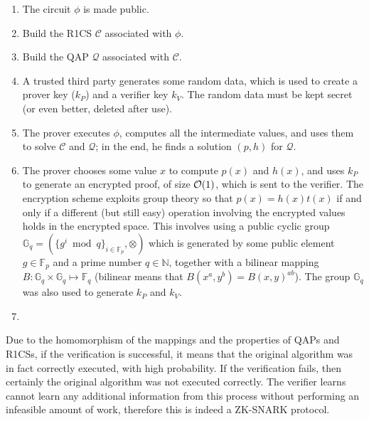 \begin{enumerate}
	\item The circuit \(\phi \) is made public.
	\item Build the R1CS \(\mathcal{C}\) associated with \(\phi \).
	\item Build the QAP \(\mathcal{Q}\) associated with \(\mathcal{C}\).
	\item A trusted third party generates some random data, which is used to create a prover key
	      (\(k_P\)) and a verifier key \(k_V\). The random data must be kept secret
	      (or even better, deleted after use).
	\item The prover executes \(\phi \), computes all the intermediate values, and uses them to
	      solve \(\mathcal{C}\) and \(\mathcal{Q}\); in the end, he finds a solution \((p, h)\)
	      for \(\mathcal{Q}\).
	\item The prover chooses some value \(x\) to compute \(p(x)\) and \(h(x)\), and uses \(k_P\)
	      to generate an encrypted proof, of size \(\mathcal{O}(1)\), which is sent to the verifier.
	      The encryption scheme exploits group theory so that \(p(x) = h(x)t(x)\) if and only if
	      a different (but still easy) operation involving the encrypted values holds in the
	      encrypted space.
	      This involves using a public cyclic group 
        \(\mathbb{G}_q = ({\{g^i \bmod q\}}_{i \in \mathbb{F}_p}, \otimes)\) which is generated by 
        some public element \(g \in \mathbb{F}_p\) and a 
        prime number \(q \in \mathbb{N}\), together with a bilinear mapping
	      \(B\colon \mathbb{G}_q \times \mathbb{G}_q \mapsto \mathbb{F}_q\) (bilinear means that
	      \(B(x^a, y^b) = {B(x, y)}^{ab}\)).
	      The group \(\mathbb{G}_q\) was also used to generate \(k_P\) and \(k_V\).
	\item
\end{enumerate}

\noindent Due to the homomorphism of the mappings and the properties of QAPs and R1CSs, if the
verification is successful, it means that the original algorithm was in fact correctly executed,
with high probability.
If the verification fails, then certainly the original algorithm was not executed correctly.
The verifier learns cannot learn any additional information from this process without performing
an infeasible amount of work, therefore this is indeed a ZK-SNARK protocol.
